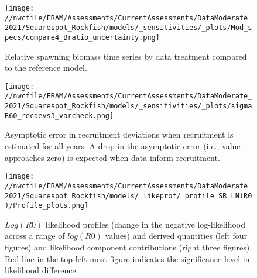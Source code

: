 \documentclass[11pt,
  english,
  a4paper,
]{article}
\begin{document}
\tagmcend\tagstructend


\begin{figure}
\centering
\texttt{[image: //nwcfile/FRAM/Assessments/CurrentAssessments/DataModerate\_2021/Squarespot\_Rockfish/models/\_sensitivities/\_plots/Mod\_specs/compare4\_Bratio\_uncertainty.png]}
\caption{Relative spawning biomass time series by data treatment compared to the reference model.\label{fig:sensi-modspec-depl}}
\end{figure}

\tagmcend\tagstructend


\begin{figure}
\centering
\texttt{[image: //nwcfile/FRAM/Assessments/CurrentAssessments/DataModerate\_2021/Squarespot\_Rockfish/models/\_sensitivities/\_plots/sigmaR60\_recdevs3\_varcheck.png]}
\caption{Asymptotic error in recruitment deviations when recruitment is estimated for all years. A drop in the asymptotic error (i.e., value approaches zero) is expected when data inform recruitment.\label{fig:rec-mod-var}}
\end{figure}

\tagmcend\tagstructend


\begin{figure}
\centering
\texttt{[image: //nwcfile/FRAM/Assessments/CurrentAssessments/DataModerate\_2021/Squarespot\_Rockfish/models/\_likeprof/\_profile\_SR\_LN(R0)/Profile\_plots.png]}
\caption{{\(Log(R0)\)\leavevmode\tagmcend\tagstructend} likelihood profiles (change in the negative log-likelihood across a range of {\(log(R0)\)\leavevmode\tagmcend\tagstructend} values) and derived quantities (left four figures) and likelihood component contributions (right three figures). Red line in the top left most figure indicates the significance level in likelihood difference.\label{fig:r0-profile-combo}}
\end{figure}
\end{document}
